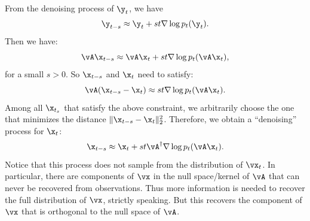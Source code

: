 \documentclass[../../book-main_zh.tex]{subfiles}
\begin{document}
From the denoising process of $\y_t$, we have
\begin{equation}
    \y_{t-s} \approx  \y_t + st \nabla \log p_t(\y_t).
\end{equation}
Then we have:
\begin{equation}
    \vA\x_{t-s} \approx   \vA\x_t + st \nabla \log p_t(\vA \x_t),
\end{equation}
for a small $s >0$. So $\x_{t-s}$ and $\x_t$ need to satisfy:
\begin{equation}
    \vA(\x_{t-s} - \x_t) \approx st \nabla \log p_t(\vA\x_t).
\end{equation}
Among all $\x_{t_s}$ that satisfy the above constraint, we
arbitrarily choose the one that minimizes the distance $\|\x_{t-s} -
\x_t\|_2^2$. Therefore, we obtain a ``denoising'' process for $\x_t$:
\begin{equation}
    \x_{t-s}  \approx \x_t + st\vA^\dagger \nabla \log p_t(\vA\x_t).
    \label{eqn:denoising-projection}
\end{equation}
Notice that this process does not sample from the distribution of
$\vx_t$. In particular, there are components of $\vx$ in the null
space/kernel of $\vA$ that can never be recovered from observations.
Thus more information is needed to recover the full distribution of
$\vx$, strictly speaking. But this recovers the component of $\vx$
that is orthogonal to the null space of $\vA$.
\end{document}
